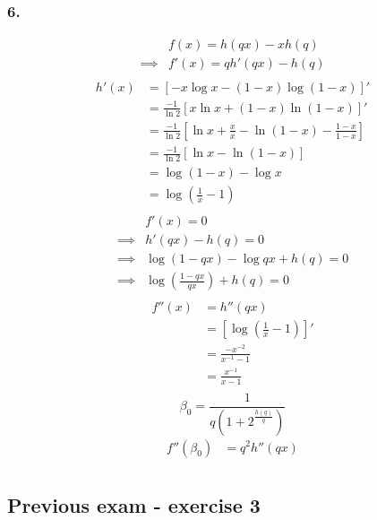 \documentclass{article}
\newcommand{\1}{\mathbf{1}}
\begin{document}
\subsubsection{6.}
\begin{align*}
           &
  f(x) = h(qx) - x h(q)  \\
  \implies &
  f'(x) = qh'(qx) - h(q) \\
\end{align*}
\begin{align*}
  h'(x)
   & = [-x \log x - (1 - x) \log (1 - x)]'                                        \\
   & = \frac{-1}{\ln 2} [x \ln x + (1 - x) \ln (1 - x)]'                          \\
   & = \frac{-1}{\ln 2} [\ln x + \frac{x}{x} - \ln (1 - x) - \frac{1 - x}{1 - x}] \\
   & = \frac{-1}{\ln 2} [\ln x - \ln (1 - x)]                                     \\
   & = \log (1 - x) - \log x                                                      \\
   & = \log (\frac{1}{x} - 1)                                                     \\
\end{align*}
\begin{align*}
           &
  f'(x) = 0                           \\
  \implies &
  h'(qx) - h(q)= 0                    \\
  \implies &
  \log (1 - qx) - \log qx + h(q) = 0  \\
  \implies &
  \log (\frac{1 - qx}{qx}) + h(q) = 0 \\
\end{align*}
\begin{align*}
  f''(x)
   & = h''(qx)                  \\
   & = [\log(\frac{1}{x} - 1)]' \\
   & = \frac{-x^{-2}}{x^{-1} - 1} \\
   & = \frac{x^{-1}}{x - 1} \\
\end{align*}
$$
\beta_0 = \frac{1}{q (1 + 2^{\frac{h(q)}{q}})}
$$
\begin{align*}
  f''(\beta_0)
  &= q^2 h'' (qx) \\
\end{align*}

\subsection{Previous exam - exercise 3}
\end{document}
